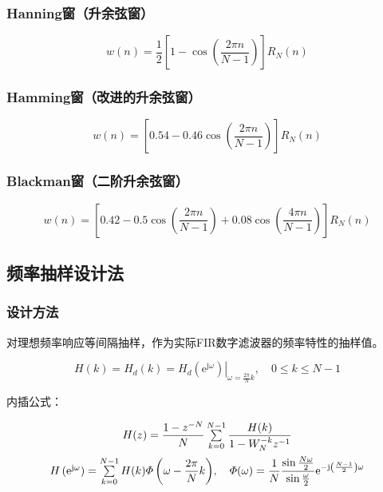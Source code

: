 \documentclass[cn, hazy, blue, normal, 14pt]{elegantnote}
\begin{document}
\subsubsection{Hanning窗（升余弦窗）}

\begin{equation}
    w(n)=\frac{1}{2}\left[1-\cos\left(\frac{2\pi n}{N-1}\right)\right]R_N(n)
\end{equation}

\subsubsection{Hamming窗（改进的升余弦窗）}

\begin{equation}
    w(n)=\left[0.54-0.46\cos\left(\frac{2\pi n}{N-1}\right)\right]R_N(n)
\end{equation}

\subsubsection{Blackman窗（二阶升余弦窗）}

\begin{equation}
    w(n)=\left[0.42-0.5\cos\left(\frac{2\pi n}{N-1}\right)+0.08\cos\left(\frac{4\pi n}{N-1}\right)\right]R_N(n)
\end{equation}

\subsection{频率抽样设计法}

\subsubsection{设计方法}

对理想频率响应等间隔抽样，作为实际FIR数字滤波器的频率特性的抽样值。

\begin{equation}
    H(k)=H_d(k)=\left.H_d\left(\text{e}^{\text{j}\omega}\right)\right|_{\omega=\frac{2\pi}{N}k},\quad 0\leq k\leq N-1
\end{equation}

内插公式：

\begin{equation}
\begin{array}{c}
    H(z)=\dfrac{1-z^{-N}}{N}\sum\limits_{k=0}^{N-1}{\dfrac{H(k)}{1-W_{N}^{-k}z^{-1}}} \\
    \addlinespace
    H\left(\text{e}^{\text{j}\omega}\right)=\sum\limits_{k=0}^{N-1}{H(k)\varPhi\left(\omega-\dfrac{2\pi}{N}k\right)}, \quad 
    \varPhi(\omega)=\dfrac{1}{N}\dfrac{\sin\frac{N\omega}{2}}{\sin\frac{\omega}{2}} \text{e}^{-\text{j}\left(\frac{N-1}{2}\right)\omega}
\end{array}
\end{equation}
\end{document}
